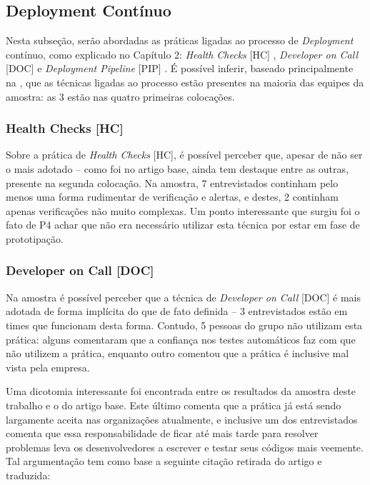 \subsection{Deployment Contínuo}

Nesta subseção, serão abordadas as práticas ligadas ao processo de \emph{Deployment} contínuo, como explicado no Capítulo 2: \emph{Health Checks} [HC] \cite{devopsBook}, \emph{Developer on Call} [DOC] \cite{devAndDeploymentFB} e \emph{Deployment Pipeline} [PIP] \cite{devopsBook}. É possível inferir, baseado principalmente na , que as técnicas ligadas ao processo estão presentes na maioria das equipes da amostra: as 3 estão nas quatro primeiras colocações. 

\subsubsection{Health Checks [HC]}

Sobre a prática de \emph{Health Checks} [HC], é possível perceber que, apesar de não ser o mais adotado -- como foi no artigo base, ainda tem destaque entre as outras, presente na segunda colocação. Na amostra, 7 entrevistados continham pelo menos uma forma rudimentar de verificação e alertas, e destes, 2 continham apenas verificações não muito complexas. Um ponto interessante que surgiu foi o fato de P4 achar que não era necessário utilizar esta técnica por estar em fase de prototipação.

\subsubsection{Developer on Call [DOC]}

Na amostra é possível perceber que a técnica de \emph{Developer on Call} [DOC] é mais adotada de forma implícita do que de fato definida -- 3 entrevistados estão em times que funcionam desta forma. Contudo, 5 pessoas do grupo não utilizam esta prática: alguns comentaram que a confiança nos testes automáticos faz com que não utilizem a prática, enquanto outro comentou que a prática é inclusive mal vista pela empresa.

Uma dicotomia interessante foi encontrada entre os resultados da amostra deste trabalho e o do artigo base. Este último comenta que a prática já está sendo largamente aceita nas organizações atualmente, e inclusive um dos entrevistados comenta que essa responsabilidade de ficar até mais tarde para resolver problemas leva os desenvolvedores a escrever e testar seus códigos mais veemente. Tal argumentação tem como base a seguinte citação retirada do artigo e traduzida:

